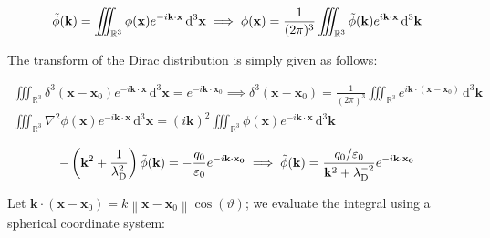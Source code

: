 \begin{equation*}
    \Tilde{\phi}(\mathbf{k})=\iiint_{\mathbb{R}^3}\phi(\mathbf{x})e^{-i\mathbf{k}\cdot\mathbf{x}}\,\mathrm{d}^3\mathbf{x}\implies\phi(\mathbf{x})=\frac{1}{(2\pi)^3}\iiint_{\mathbb{R}^3}\Tilde{\phi}(\mathbf{k})e^{i\mathbf{k}\cdot\mathbf{x}}\,\mathrm{d}^3\mathbf{k}
\end{equation*}

The transform of the Dirac distribution is simply given as follows:

\begin{gather*}
    \iiint_{\mathbb{R}^3}\delta^3(\mathbf{x}-\mathbf{x}_0)e^{-i\mathbf{k}\cdot\mathbf{x}}\,\mathrm{d}^3\mathbf{x}=e^{-i\mathbf{k}\cdot\mathbf{x}_0}\implies \delta^3(\mathbf{x}-\mathbf{x}_0)=\frac{1}{(2\pi)^3}\iiint_{\mathbb{R}^3}e^{i\mathbf{k}\cdot(\mathbf{x}-\mathbf{x}_0)}\,\mathrm{d}^3\mathbf{k}\\
    \iiint_{\mathbb{R}^3}\nabla^2\phi(\mathbf{x})e^{-i\mathbf{k}\cdot\mathbf{x}}\,\mathrm{d}^3\mathbf{x}=(i\mathbf{k})^2\iiint_{\mathbb{R}^3}\phi(\mathbf{x}) e^{-i\mathbf{k}\cdot\mathbf{x}}\,\mathrm{d}^3\mathbf{k}
\end{gather*}

\begin{equation*}
    -\left(\mathbf{k}^2+\frac{1}{\lambda_\mathrm{D}^2}\right)\Tilde{\phi}(\mathbf{k})=-\frac{q_0}{\varepsilon_0}e^{-i\mathbf{k}\cdot\mathbf{x_0}}\implies\Tilde{\phi}(\mathbf{k})=\frac{q_0/\varepsilon_0}{\mathbf{k}^2+\lambda_\mathrm{D}^{-2}}e^{-i\mathbf{k}\cdot\mathbf{x_0}}
\end{equation*}

Let $\mathbf{k}\cdot\left(\mathbf{x}-\mathbf{x}_0\right)=k \left\|\mathbf{x}-\mathbf{x}_0\right\|\cos(\vartheta)$; we evaluate the integral using a spherical coordinate system:

